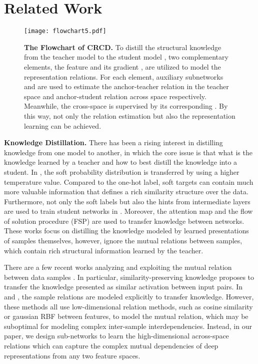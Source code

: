 \documentclass[final]{cvpr}
\begin{document}
\section{Related Work}
\begin{figure*}[t]
\begin{center}
    \texttt{[image: flowchart5.pdf]}
    \caption{ \textbf{The Flowchart of CRCD.}
    To distill the structural knowledge from the teacher model  to the student model , 
     two complementary elements,
    the feature  and its gradient , are utilized to model the representation relations.
    For each element, auxiliary subnetworks  and  are used to estimate the anchor-teacher relation  in the teacher space and anchor-student relation  across space respectively.
Meanwhile, the cross-space  is supervised by its corresponding . 
By this way, not only the relation estimation but also the representation learning can be achieved.
    }
    \label{fig:flowchart}
    
\end{center}
\vspace{-1.8em}
\end{figure*}

\noindent \textbf{Knowledge Distillation.}
There has been a rising interest in distilling knowledge from one model to another, in which the core issue is that what is the knowledge learned by a teacher and how to best distill the knowledge into a student. 
In \cite{hinton2015distilling}, the soft probability distribution is transferred by using a higher temperature value.
Compared to the one-hot label, soft targets can contain much more valuable information that defines a rich similarity structure over the data.
Furthermore, not only the soft labels but also the hints from intermediate layers are used to train student networks in \cite{romero2014fitnets}.
Moreover, the attention map \cite{ATloss} and the flow of solution procedure (FSP) \cite{fsp} are used to transfer knowledge between networks.
These works focus on distilling the knowledge modeled by learned presentations of samples themselves, 
however, ignore the mutual relations between samples, which contain rich structural information learned by the teacher.

There are a few recent works analyzing and exploiting the mutual relation between data samples \cite{relationgraph,peng2019correlation,park2019relational,pkt,Chen_2018_CVPR,Chen_2018_CVPR_video,Chen_2016_CVPR,Li_2019_ICCV}.
In particular, similarity-preserving knowledge   \cite{tung2019similarity} proposes to transfer the knowledge presented as similar activation between input pairs.
In \cite{peng2019correlation} and \cite{park2019relational}, the sample relations are modeled explicitly to transfer knowledge.
However,  these methods all use low-dimensional relation methods, such as cosine similarity \cite{tung2019similarity}  or gaussian RBF \cite{peng2019correlation} between features, to model the mutual relation, which may be suboptimal for modeling complex inter-sample interdependencies.
Instead, in our paper, we  design  sub-networks to learn the  high-dimensional across-space relations which can capture the complex mutual dependencies of deep representations from any two feature spaces.
\end{document}
